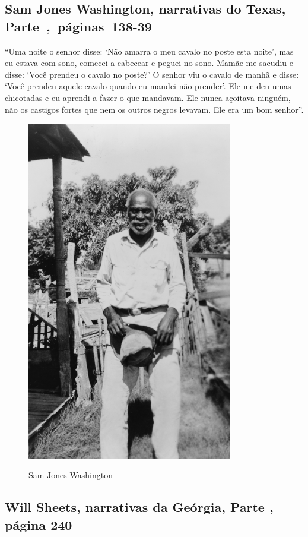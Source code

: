 \subsection{Sam Jones Washington, narrativas do Texas, Parte~,~páginas~138-39}
\label{ref280}

``Uma noite o senhor disse: `Não amarra o meu cavalo no poste esta
noite', mas eu estava com sono, comecei a cabecear e peguei no sono.
Mamãe me sacudiu e disse: `Você prendeu o cavalo no poste?' O senhor viu
o cavalo de manhã e disse: `Você prendeu aquele cavalo quando eu mandei
não prender'. Ele me deu umas chicotadas e eu aprendi a fazer o que
mandavam. Ele nunca açoitava ninguém, não os castigos fortes que nem os
outros negros levavam. Ele era um bom senhor''.

\pagebreak
\thispagestyle{empty}
\begin{figure}[!ht]
\centering
 \includegraphics[width=90mm]{./imgs/samjones_recorte2.jpg} \label{img8}
\caption{Sam Jones Washington}
\end{figure}

\subsection{Will Sheets, narrativas da Geórgia, Parte , página 240}
\label{ref237}

